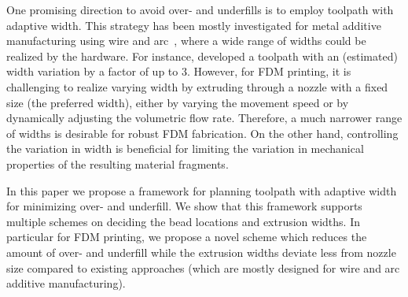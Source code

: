 One promising direction to avoid over- and underfills is to employ toolpath with adaptive width. 
This strategy has been mostly investigated for metal additive manufacturing using wire and arc~\cite{Ding2014}, where a wide range of widths could be realized by the hardware. 
For instance, \citeauthor{Ding2016a} developed a toolpath with an (estimated) width variation by a factor of up to $3$.
However, for FDM printing, it is challenging to realize varying width by extruding through a nozzle with a fixed size (the preferred width), either by varying the movement speed or by dynamically adjusting the volumetric flow rate. 
Therefore, a much narrower range of widths is desirable for robust FDM fabrication.
On the other hand, controlling the variation in width is beneficial for limiting the variation in mechanical properties of the resulting material fragments. 

In this paper we propose a framework for planning toolpath with adaptive width for minimizing over- and underfill. 
We show that this framework supports multiple schemes on deciding the bead locations and extrusion widths. 
In particular for FDM printing, we propose a novel scheme which reduces the amount of over- and underfill while the extrusion widths deviate less from nozzle size compared to existing approaches (which are mostly designed for wire and arc additive manufacturing). 

